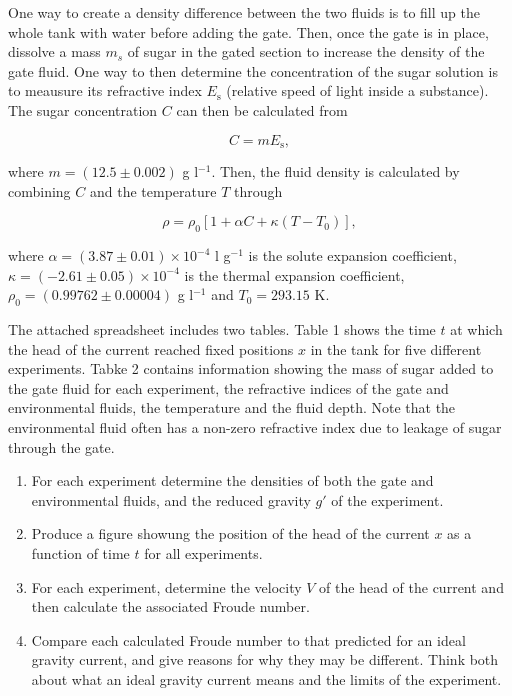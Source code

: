 \documentclass[]{article}
\theoremstyle{definition}
\begin{document}
\begin{enumerate}
One way to create a density difference between the two fluids is to fill up the whole tank with water before adding the gate. Then, once the gate is in place, dissolve a mass $m_{s}$ of sugar in the gated section to increase the density of the gate fluid. One way to then determine the concentration of the sugar solution is to meausure its refractive index $E_{\text{s}}$ (relative speed of light inside a substance). The sugar concentration $C$ can then be calculated from

\begin{equation}
  \label{equ:equi_sal}
  C = m E_{\text{s}},
\end{equation}

where $m = (12.5 \pm 0.002)$ g l$^{-1}$. Then, the fluid density is calculated by combining $C$ and the temperature $T$ through

\begin{equation}
  \label{equ:dens_model}
  \rho = \rho_{0} [1 + \alpha C+ \kappa (T - T_{0})],
\end{equation}

where $\alpha = (3.87 \pm 0.01) \times 10^{-4}$ l g$^{-1}$ is the solute expansion coefficient, $\kappa = (-2.61 \pm 0.05) \times 10^{-4}$ is the thermal expansion coefficient, $\rho_{0} = (0.99762 \pm 0.00004)$ g l$^{-1}$ and $T_{0} = 293.15$ K.

The attached spreadsheet includes two tables. Table 1 shows the time $t$ at which the head of the current reached fixed positions $x$ in the tank for five different experiments. Tabke 2 contains information showing the mass of sugar added to the gate fluid for each experiment, the refractive indices of the gate and environmental fluids, the temperature and the fluid depth. Note that the environmental fluid often has a non-zero refractive index due to leakage of sugar through the gate.

\begin{enumerate}
\item For each experiment determine the densities of both the gate and environmental fluids, and the reduced gravity $g'$ of the experiment.
\item Produce a figure showung the position of the head of the current $x$ as a function of time $t$ for all experiments.
\item For each experiment, determine the velocity $V$ of the head of the current and then calculate the associated Froude number.
\item Compare each calculated Froude number to that predicted for an ideal gravity current, and give reasons for why they may be different. Think both about what an ideal gravity current means and the limits of the experiment.
\end{enumerate}



\end{enumerate}
\end{document}

